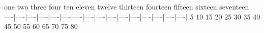 one two three four  ten eleven twelve
thirteen fourteen fifteen sixteen
seventeen
----|----|----|----|----|----|----|----|----|----|----|----|----|----|----|----|
   5   10   15   20   25   30   35   40   45   50   55   60   65   70   75   80
